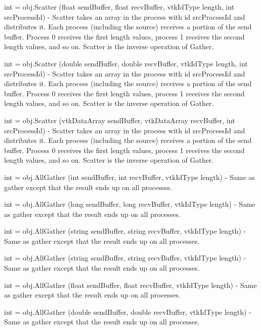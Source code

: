 \begin{DoxyItemize}
\item {\ttfamily int = obj.\-Scatter (float send\-Buffer, float recv\-Buffer, vtk\-Id\-Type length, int src\-Process\-Id)} -\/ Scatter takes an array in the process with id {\ttfamily src\-Process\-Id} and distributes it. Each process (including the source) receives a portion of the send buffer. Process 0 receives the first {\ttfamily length} values, process 1 receives the second {\ttfamily length} values, and so on. Scatter is the inverse operation of Gather.  
\item {\ttfamily int = obj.\-Scatter (double send\-Buffer, double recv\-Buffer, vtk\-Id\-Type length, int src\-Process\-Id)} -\/ Scatter takes an array in the process with id {\ttfamily src\-Process\-Id} and distributes it. Each process (including the source) receives a portion of the send buffer. Process 0 receives the first {\ttfamily length} values, process 1 receives the second {\ttfamily length} values, and so on. Scatter is the inverse operation of Gather.  
\item {\ttfamily int = obj.\-Scatter (vtk\-Data\-Array send\-Buffer, vtk\-Data\-Array recv\-Buffer, int src\-Process\-Id)} -\/ Scatter takes an array in the process with id {\ttfamily src\-Process\-Id} and distributes it. Each process (including the source) receives a portion of the send buffer. Process 0 receives the first {\ttfamily length} values, process 1 receives the second {\ttfamily length} values, and so on. Scatter is the inverse operation of Gather.  
\item {\ttfamily int = obj.\-All\-Gather (int send\-Buffer, int recv\-Buffer, vtk\-Id\-Type length)} -\/ Same as gather except that the result ends up on all processes.  
\item {\ttfamily int = obj.\-All\-Gather (long send\-Buffer, long recv\-Buffer, vtk\-Id\-Type length)} -\/ Same as gather except that the result ends up on all processes.  
\item {\ttfamily int = obj.\-All\-Gather (string send\-Buffer, string recv\-Buffer, vtk\-Id\-Type length)} -\/ Same as gather except that the result ends up on all processes.  
\item {\ttfamily int = obj.\-All\-Gather (string send\-Buffer, string recv\-Buffer, vtk\-Id\-Type length)} -\/ Same as gather except that the result ends up on all processes.  
\item {\ttfamily int = obj.\-All\-Gather (float send\-Buffer, float recv\-Buffer, vtk\-Id\-Type length)} -\/ Same as gather except that the result ends up on all processes.  
\item {\ttfamily int = obj.\-All\-Gather (double send\-Buffer, double recv\-Buffer, vtk\-Id\-Type length)} -\/ Same as gather except that the result ends up on all processes.  

\end{DoxyItemize}
